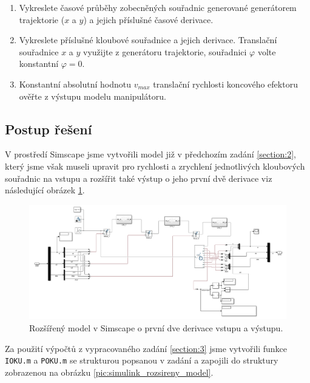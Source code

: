 \documentclass{article}
\begin{document}
\begin{enumerate}
\begin{itemize}
					\end{itemize}
					\item Vykreslete časové průběhy zobecněných souřadnic generované generátorem trajektorie (\(x\) a \(y\)) a jejich příslušné časové derivace.
					\item Vykreslete příslušné kloubové souřadnice a jejich derivace. Translační souřadnice \(x\) a \(y\)	využijte z generátoru trajektorie, souřadnici \(\varphi\) volte konstantní \(\varphi=0\).
					\item Konstantní absolutní hodnotu \(v_{max}\) translační rychlosti koncového efektoru ověřte z výstupu modelu manipulátoru.
				\end{enumerate}
			
			
		\subsection{Postup řešení}
			V prostředí Simscape jsme vytvořili model již v předchozím zadání \ref{section:2}, který jsme však museli upravit pro rychlosti a zrychlení jednotlivých kloubových souřadnic na vstupu a rozšířit také výstup o jeho první dvě derivace viz následující obrázek \ref{pic:simulink_rozsireny_model_simscape}.\\
				\begin{figure}[H]
					\centering
					\includegraphics[width=\textwidth]{./Graphics/4_Graphics/simulink_rozsireny_model_simscape.png}
					\caption{Rozšířený model v Simscape o první dve derivace vstupu a výstupu.}
					\label{pic:simulink_rozsireny_model_simscape}
				\end{figure}
			Za použití výpočtů z vypracovaného zadání \ref{section:3} jsme vytvořili funkce \verb|IOKU.m| a \verb|POKU.m| se strukturou popsanou v zadání a zapojili do struktury zobrazenou na obrázku \ref{pic:simulink_rozsireny_model}.\\
\end{document}
